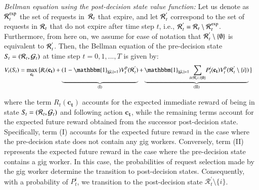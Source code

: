\noindent \textit{Bellman equation using the post-decision state value function:} Let us denote as $\mathcal{R}\hspace{0.05em}_t^{\mathrm{exp}}$ the set of requests in~$\mathcal{R}\hspace{0.05em}_{t}$ that expire, and let $\mathcal{R}\hspace{0.05em}_t^{'}$ correspond to the set of requests in $\mathcal{R}\hspace{0.05em}_t$ that do not expire after time step $t$, i.e., $\mathcal{R}\hspace{0.05em}_t^{'} = \mathcal{R}\hspace{0.05em}_{t} \setminus \mathcal{R}\hspace{0.05em}_t^{\mathrm{exp}}$. Furthermore, from here on, we assume for ease of notation that $\mathcal{R}\hspace{0.05em}_t^{'} \setminus \{\emptyset\}$ is equivalent to $\mathcal{R}\hspace{0.05em}_t^{'} $. Then, the Bellman equation of the pre-decision state $S\hspace{-0.1em}_t = (\mathcal{R}\hspace{0.05em}_{t},\mathcal{G}_t)$ at time step $t = 0,1,...,T$ is given by: 
\begin{align}
V_t(S\hspace{-0.1em}_t) & = \max_{\mathbf{c_t}} \big\{  R_t(\mathbf{c_t}) + \underbrace{(1 - \mathbbm{1}_{|\mathcal{G}_t|=1})  V^{\mathrm{p}}_{t}(\mathcal{R}\hspace{0.05em}_t^{'})\vphantom{\sum_{i \in \mathcal{R}\hspace{0.05em}_{t} \cup \{\emptyset\}}}}_{\text{(I)}}  + \underbrace{\mathbbm{1}_{|\mathcal{G}_t|=1} \! \sum_{i \in \mathcal{R}\hspace{0.05em}_{t} \cup \{\emptyset\}} \! P^i_{t}(\mathbf{c_t}) V^{\mathrm{p}}_{t}(\mathcal{R}\hspace{0.05em}_t^{'} \setminus \{i\})}_{\text{(II)}}  \big\}
\label{eq:bell_post}
\end{align}

\noindent where the term $R_t(\mathbf{c_t})$ accounts for the expected immediate reward of being in state $S\hspace{-0.1em}_t = (\mathcal{R}\hspace{0.05em}_{t},\mathcal{G}_t)$ and following action $\mathbf{c_t}$, while the remaining terms account for the expected future reward obtained from the successor post-decision state. Specifically, term (I) accounts for the expected future reward in the case where the pre-decision state does not contain any gig workers. Conversely, term (II) represents the expected future reward in the case where the pre-decision state contains a gig worker. In this case, the probabilities of request selection made by the gig worker determine the transition to post-decision states. Consequently, with a probability of \(P^i_{t}\), we transition to the post-decision state \(\mathcal{R}_{t}^{'} \setminus \{i\}\). 

